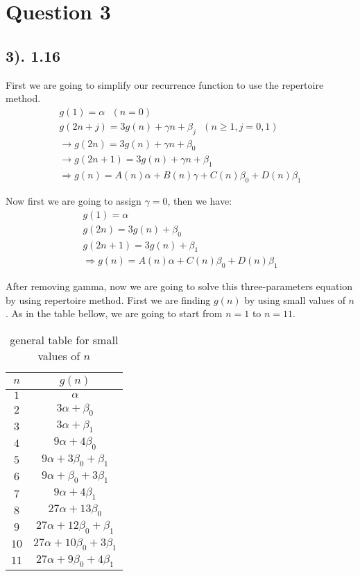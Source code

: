 \documentclass[12pt]{article}
\begin{document}
\section*{Question 3}
\subsection*{3). 1.16}
First we are going to simplify our recurrence function to use the repertoire method.
\begin{gather*}
    g(1) = \alpha \text{ $(n=0)$} \\
    g(2n+j) = 3g(n) + \gamma n + \beta_{j} \text{ $(n \geq 1, j=0,1)$} \\
    \to g(2n) = 3g(n) + \gamma n + \beta_{0} \\
    \to g(2n+1) = 3g(n) + \gamma n + \beta_{1} \\
    \Rightarrow g(n) = A(n) \alpha + B(n) \gamma + C(n) \beta_{0} + D(n) \beta_{1}
\end{gather*}

Now first we are going to assign $\gamma = 0$, then we have:
\begin{gather*}
    g(1) = \alpha \\
    g(2n) = 3g(n) + \beta_{0} \\
    g(2n+1) = 3g(n) + \beta_{1} \\
    \Rightarrow g(n) = A(n) \alpha + C(n) \beta_{0} + D(n) \beta_{1}
\end{gather*}

After removing gamma, now we are going to solve this three-parameters equation by using repertoire method.
First we are finding $g(n)$ by using small values of $n$. As in the table bellow, we are going to start
from $n=1$ to $n=11$.
\begin{table}[H]
    \centering
    \begin{tabular}{c|c}
        $n$ & $g(n)$ \\
        \hline
        $1$ & $\alpha$ \\
        \hline
        $2$ & $3\alpha + \beta_{0}$ \\
        $3$ & $3\alpha + \beta_{1}$ \\
        \hline
        $4$ & $9\alpha + 4\beta_{0}$ \\
        $5$ & $9\alpha + 3\beta_{0} + \beta_{1}$ \\
        $6$ & $9\alpha + \beta_{0} + 3\beta_{1}$ \\
        $7$ & $9\alpha + 4\beta_{1}$ \\
        \hline
        $8$ & $27\alpha + 13\beta_{0}$ \\
        $9$ & $27\alpha + 12\beta_{0} + \beta_{1}$ \\
        $10$ & $27\alpha + 10\beta_{0} + 3\beta_{1}$ \\
        $11$ & $27\alpha + 9\beta_{0} + 4\beta_{1}$
    \end{tabular}
    \caption{general table for small values of $n$}
    \label{tab:sample}
\end{table}
\end{document}
